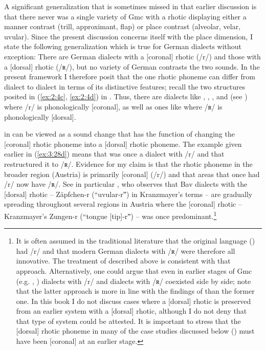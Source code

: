 A significant generalization that is sometimes missed in that earlier discussion is that there  never was a single variety of Gmc with a rhotic displaying either a manner contrast (trill, approximant, flap) or place contrast (alveolar, velar, uvular). Since the present discussion concerns itself with the place dimension, I state the following generalization which is true for German dialects without exception: There are German dialects with a [coronal] rhotic (/r/) and those with a [dorsal] rhotic (/ʀ/), but no variety of German contrasts the two sounds. In the present framework I therefore posit that the one rhotic phoneme can differ from dialect to dialect in terms of its distinctive features; recall the two structures posited in (\ref{ex:2:4c}, \ref{ex:2:4d}) in . Thus, there are dialects like , , , and  (see ) where /r/ is phonologically [coronal], as well as ones like  where /ʀ/ is phonologically [dorsal].

 in  can be viewed as a sound change that has the function of changing the [coronal] rhotic phoneme into a [dorsal] rhotic phoneme. The example given earlier in (\ref{ex:3:28d}) means that  was once a dialect with /r/ and that  restructured it to /ʀ/. Evidence for my claim is that the rhotic phoneme in the broader region (Austria) is primarily [coronal] (/r/) and that areas that once had /r/ now have /ʀ/. See in particular \citet[121]{Kranzmayer1956}, who observes that Bav dialects with the [dorsal] rhotic -- Zäpfchen-r (“uvular-rˮ) in Kranzmayer’s terms -- are gradually spreading throughout several regions in Austria where the [coronal] rhotic -- Kranzmayer’s Zungen-r (“tongue [tip]-rˮ) -- was once predominant.\footnote{{It is often assumed in the traditional literature that the original language () had /r/ and that modern German dialects with /ʀ/ were therefore all innovative. The treatment of  described above is consistent with that approach. Alternatively, one could argue that even in earlier stages of Gmc (e.g. , ) dialects with /r/ and dialects with /ʀ/ coexisted side by side; note that the latter approach is more in line with the findings of \citet{Howell1991} than the former one. In this book I do not discuss cases where a [dorsal] rhotic is preserved from an earlier system with a [dorsal] rhotic, although I do not deny that that type of system could be attested. It is important to stress that the [dorsal] rhotic phoneme in many of the case studies discussed below () must have been [coronal] at an earlier stage.}}


